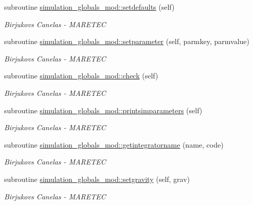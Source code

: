 \begin{DoxyCompactItemize}
\item 
subroutine \hyperlink{namespacesimulation__globals__mod_ac2ac06271de377004c67b6ba2f3ed353}{simulation\+\_\+globals\+\_\+mod\+::setdefaults} (self)
\begin{DoxyCompactList}\small\item\em Birjukovs Canelas -\/ M\+A\+R\+E\+T\+EC \end{DoxyCompactList}\item 
subroutine \hyperlink{namespacesimulation__globals__mod_a8a05831d4c3e3eb5741d65978f6fcf61}{simulation\+\_\+globals\+\_\+mod\+::setparameter} (self, parmkey, parmvalue)
\begin{DoxyCompactList}\small\item\em Birjukovs Canelas -\/ M\+A\+R\+E\+T\+EC \end{DoxyCompactList}\item 
subroutine \hyperlink{namespacesimulation__globals__mod_a41249abb5c33ef9e8bff448f0b3826fa}{simulation\+\_\+globals\+\_\+mod\+::check} (self)
\begin{DoxyCompactList}\small\item\em Birjukovs Canelas -\/ M\+A\+R\+E\+T\+EC \end{DoxyCompactList}\item 
subroutine \hyperlink{namespacesimulation__globals__mod_a97c04d0289a9f2d004a9329cb7ab16f0}{simulation\+\_\+globals\+\_\+mod\+::printsimparameters} (self)
\begin{DoxyCompactList}\small\item\em Birjukovs Canelas -\/ M\+A\+R\+E\+T\+EC \end{DoxyCompactList}\item 
subroutine \hyperlink{namespacesimulation__globals__mod_a68e871ed8e5d3930884e968c6fdafddc}{simulation\+\_\+globals\+\_\+mod\+::getintegratorname} (name, code)
\begin{DoxyCompactList}\small\item\em Birjukovs Canelas -\/ M\+A\+R\+E\+T\+EC \end{DoxyCompactList}\item 
subroutine \hyperlink{namespacesimulation__globals__mod_a9e92dfed4ef7388208adce768f064554}{simulation\+\_\+globals\+\_\+mod\+::setgravity} (self, grav)
\begin{DoxyCompactList}\small\item\em Birjukovs Canelas -\/ M\+A\+R\+E\+T\+EC \end{DoxyCompactList}\item 

\end{DoxyCompactItemize}
